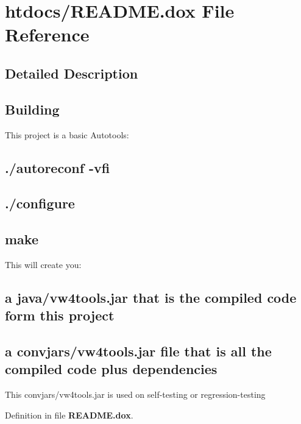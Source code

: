 \section{htdocs/\+R\+E\+A\+D\+M\+E.dox File Reference}
\label{README_8dox}


\subsection{Detailed Description}
\subsection*{Building }

This project is a basic Autotools\+: \subsection*{./autoreconf -\/vfi}

\subsection*{./configure}

\subsection*{make}

This will create you\+: \subsection*{a java/vw4tools.\+jar that is the compiled code form this project}

\subsection*{a convjars/vw4tools.\+jar file that is all the compiled code plus dependencies}

This convjars/vw4tools.\+jar is used on self-\/testing or regression-\/testing 

Definition in file {\bf R\+E\+A\+D\+M\+E.\+dox}.


